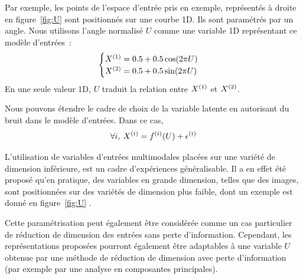 \documentclass[../main]{subfiles}
\begin{document}
Par exemple, les points de l'espace d'entrée pris en exemple, représentés à droite en figure~\ref{fig:U} sont positionnés sur une courbe 1D. Ils sont paramétrés par un angle.
Nous utilisons l'angle normalisé $U$ comme une variable 1D représentant ce modèle d'entrées~:
\begin{equation}
 \begin{cases}
     X^{({1})}= 0.5 + 0.5  \cos(2\pi U)\\
     X^{({2})} = 0.5 + 0.5 \sin(2 \pi U)
    \end{cases}\,
\end{equation}
En une seule valeur 1D, $U$ traduit la relation entre $X^{({1})}$ et $X^{({2})}$.

Nous pouvons étendre le cadre de choix de la variable latente en autorisant du bruit dans le modèle d'entrées.
Dans ce cas, 
\begin{equation}
    \forall i, \: X^{({i})} = f^{({i})}(U) + \epsilon^{({i})}
\end{equation}

L'utilisation de variables d'entrées multimodales placées sur une variété de dimension inférieure, est un cadre d'expériences généralisable. 
Il a en effet été proposé qu'en pratique, des variables en grande dimension, telles que des images, sont positionnées sur des variétés de dimension plus faible, dont un exemple est donné en figure~\ref{fig:U} \cite{Pless2009ASO}.

Cette paramétrisation peut également être considérée comme un cas particulier de réduction de dimension des entrées sans perte d'information.
Cependant, les représentations proposées pourront également être adaptables à une variable $U$ obtenue par une méthode de réduction de dimension avec perte d'information (par exemple par une analyse en composantes principales).
\end{document}
